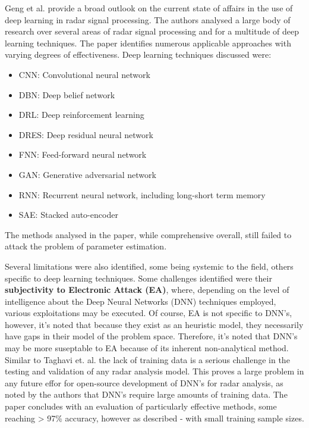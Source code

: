 Geng et al. \cite{mason_deep_2017} provide a broad outlook on the current state of affairs in the use of deep learning in radar signal processing. The authors analysed a large body of research over several areas of radar signal processing and for a multitude of deep learning techniques. The paper identifies numerous applicable approaches with varying degrees of effectiveness. Deep learning techniques discussed were:
\begin{itemize}
 \item {}CNN: Convolutional neural network
 \item DBN: Deep belief network
 \item DRL: Deep reinforcement learning
 \item DRES: Deep residual neural network
 \item FNN: Feed-forward neural network
 \item GAN: Generative adversarial network
 \item RNN: Recurrent neural network, including long-short term memory
 \item SAE: Stacked auto-encoder
\end{itemize}

The methods analysed in the paper, while comprehensive overall, still failed to attack the problem of parameter estimation. 

Several limitations were also identified, some being systemic to the field, others specific to deep learning techniques. Some challenges identified were their \textbf{subjectivity to Electronic Attack (EA)}, where, depending on the level of intelligence about the Deep Neural Networks (DNN) techniques employed, various exploitations may be executed. Of course, EA is not specific to DNN's, however, it's noted that because they exist as an heuristic model, they necessarily have gaps in their model of the problem space. Therefore, it's noted that DNN's may be more suseptable to EA because of its inherent non-analytical method. Similar to Taghavi et. al. the lack of training data is a serious challenge in the testing and validation of any radar analysis model. This proves a large problem in any future effor for open-source development of DNN's for radar analysis, as noted by the authors that DNN's require large amounts of training data. The paper concludes with an evaluation of particularly effective methods, some reaching > 97\% accuracy, however as described - with small training sample sizes.

